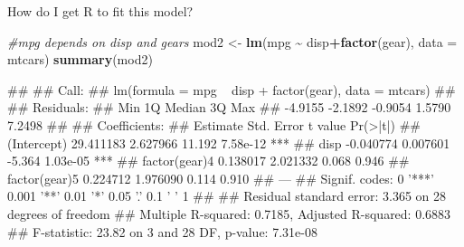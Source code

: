 \documentclass[
  ignorenonframetext,
  aspectratio=169]{beamer}
\newenvironment{Shaded}{\begin{snugshade}}{\end{snugshade}}
\newcommand{\AttributeTok}[1]{\textcolor[rgb]{0.13,0.29,0.53}{#1}}
\newcommand{\CommentTok}[1]{\textcolor[rgb]{0.56,0.35,0.01}{\textit{#1}}}
\newcommand{\FunctionTok}[1]{\textcolor[rgb]{0.13,0.29,0.53}{\textbf{#1}}}
\newcommand{\NormalTok}[1]{#1}
\newcommand{\OtherTok}[1]{\textcolor[rgb]{0.56,0.35,0.01}{#1}}
\newcommand{\SpecialCharTok}[1]{\textcolor[rgb]{0.81,0.36,0.00}{\textbf{#1}}}
\let\oldShaded\Shaded %
\let\endoldShaded\endShaded
\renewenvironment{Shaded}{\scriptsize\oldShaded}{\endoldShaded}
\let\oldverbatim\verbatim %
\let\endoldverbatim\endverbatim
\renewenvironment{verbatim}{\tiny\oldverbatim}{\endoldverbatim}
\begin{document}
\begin{frame}[fragile]{How do I get R to fit this model?}
\protect\hypertarget{how-do-i-get-r-to-fit-this-model-3}{}
\tiny

\begin{Shaded}
\begin{Highlighting}[]
\CommentTok{\#mpg depends on disp and gears}
\NormalTok{mod2 }\OtherTok{\textless{}{-}} \FunctionTok{lm}\NormalTok{(mpg }\SpecialCharTok{\textasciitilde{}}\NormalTok{ disp}\SpecialCharTok{+}\FunctionTok{factor}\NormalTok{(gear), }\AttributeTok{data =}\NormalTok{ mtcars) }
\FunctionTok{summary}\NormalTok{(mod2)}
\end{Highlighting}
\end{Shaded}

\begin{verbatim}
## 
## Call:
## lm(formula = mpg ~ disp + factor(gear), data = mtcars)
## 
## Residuals:
##     Min      1Q  Median      3Q     Max 
## -4.9155 -2.1892 -0.9054  1.5790  7.2498 
## 
## Coefficients:
##                Estimate Std. Error t value Pr(>|t|)    
## (Intercept)   29.411183   2.627966  11.192 7.58e-12 ***
## disp          -0.040774   0.007601  -5.364 1.03e-05 ***
## factor(gear)4  0.138017   2.021332   0.068    0.946    
## factor(gear)5  0.224712   1.976090   0.114    0.910    
## ---
## Signif. codes:  0 '***' 0.001 '**' 0.01 '*' 0.05 '.' 0.1 ' ' 1
## 
## Residual standard error: 3.365 on 28 degrees of freedom
## Multiple R-squared:  0.7185, Adjusted R-squared:  0.6883 
## F-statistic: 23.82 on 3 and 28 DF,  p-value: 7.31e-08
\end{verbatim}
\end{frame}
\end{document}
